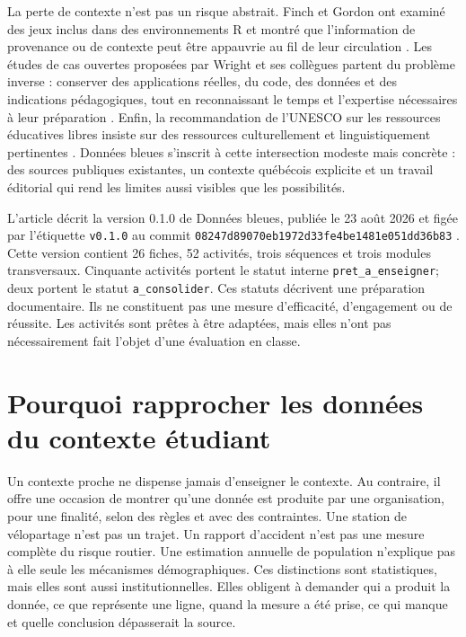 La perte de contexte n'est pas un risque abstrait. Finch et Gordon ont examiné des jeux inclus dans des environnements R et montré que l'information de provenance ou de contexte peut être appauvrie au fil de leur circulation \cite{finch}. Les études de cas ouvertes proposées par Wright et ses collègues partent du problème inverse : conserver des applications réelles, du code, des données et des indications pédagogiques, tout en reconnaissant le temps et l'expertise nécessaires à leur préparation \cite{wright}. Enfin, la recommandation de l'UNESCO sur les ressources éducatives libres insiste sur des ressources culturellement et linguistiquement pertinentes \cite{unesco}. Données bleues s'inscrit à cette intersection modeste mais concrète : des sources publiques existantes, un contexte québécois explicite et un travail éditorial qui rend les limites aussi visibles que les possibilités.

L'article décrit la version 0.1.0 de Données bleues, publiée le 23 août 2026 et figée par l'étiquette \texttt{v0.1.0} au commit \texttt{08247d89070eb1972d33fe4be1481e051dd36b83} \cite{donneesbleues}. Cette version contient 26 fiches, 52 activités, trois séquences et trois modules transversaux. Cinquante activités portent le statut interne \texttt{pret\_a\_enseigner}; deux portent le statut \texttt{a\_consolider}. Ces statuts décrivent une préparation documentaire. Ils ne constituent pas une mesure d'efficacité, d'engagement ou de réussite. Les activités sont prêtes à être adaptées, mais elles n'ont pas nécessairement fait l'objet d'une évaluation en classe.

\section{Pourquoi rapprocher les données du contexte étudiant}

Un contexte proche ne dispense jamais d'enseigner le contexte. Au contraire, il offre une occasion de montrer qu'une donnée est produite par une organisation, pour une finalité, selon des règles et avec des contraintes. Une station de vélopartage n'est pas un trajet. Un rapport d'accident n'est pas une mesure complète du risque routier. Une estimation annuelle de population n'explique pas à elle seule les mécanismes démographiques. Ces distinctions sont statistiques, mais elles sont aussi institutionnelles. Elles obligent à demander qui a produit la donnée, ce que représente une ligne, quand la mesure a été prise, ce qui manque et quelle conclusion dépasserait la source.


